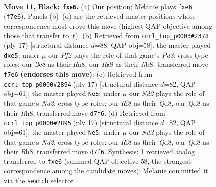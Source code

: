 \documentclass[11pt]{article}
\begin{document}
\clearpage

\begin{figure}[p]\centering
\begin{subfigure}{0.46\textwidth}\centering
\resizebox{\linewidth}{!}{%
\newchessgame
\chessboard[
  setfen={rnbq1rk1/pp1nbppp/4P3/8/P2P2PP/2N2N2/1P3P2/R1BQKB1R b KQ - 0 11},
  showmover=false,
  pgfstyle=straightmove, color=movearrow, markmove={f7-e6}
]}
\caption{}
\end{subfigure}\hfill
\begin{subfigure}{0.46\textwidth}\centering
\resizebox{\linewidth}{!}{%
\newchessgame
\chessboard[
  setfen={rnbq1rk1/ppp3bp/3p1np1/4P3/2P5/2N2N2/PP2BPPP/R1BQK2R b KQ - 0 9},
  showmover=false,
  pgfstyle=straightmove, color=movearrow, markmove={d6-e5}
]}
\caption{}
\end{subfigure}
\\[4pt]
\begin{subfigure}{0.46\textwidth}\centering
\resizebox{\linewidth}{!}{%
\newchessgame
\chessboard[
  setfen={rnbqk2r/pp1nppbp/4P1p1/8/3N4/2N5/PPP3PP/R1BQKB1R b KQkq - 0 9},
  showmover=false,
  pgfstyle=straightmove, color=movearrow, markmove={d7-e5}
]}
\caption{}
\end{subfigure}\hfill
\begin{subfigure}{0.46\textwidth}\centering
\resizebox{\linewidth}{!}{%
\newchessgame
\chessboard[
  setfen={rnbqk2r/pp1nppbp/4P1p1/8/3N4/2N5/PPP3PP/R1BQKB1R b KQkq - 0 9},
  showmover=false,
  pgfstyle=straightmove, color=movearrow, markmove={d7-e5}
]}
\caption{}
\end{subfigure}
\caption{\textbf{Move 11, Black: \texttt{fxe6}.} (a) Our position; Melanie plays \texttt{fxe6} (\texttt{f7e6}). Panels (b)--(d) are the retrieved master positions whose correspondence most drove this move (highest QAP objective among those that transfer to it). (b) Retrieved from \texttt{ccrl\_top\_p0003\#2378} (ply 17) [structural distance $d$=88, QAP obj=58]: the master played \texttt{dxe5}; under $\mu$ our \emph{Pf2} plays the role of that game's \emph{Pd3}; cross-type roles: our \emph{B}c8 as their \emph{R}a8, our \emph{R}a8 as their \emph{N}b8; transferred move \texttt{f7e6} \textbf{(endorses this move)}. (c) Retrieved from \texttt{ccrl\_top\_p0000\#2894} (ply 17) [structural distance $d$=82, QAP obj=61]: the master played \texttt{Ne5}; under $\mu$ our \emph{Nd2} plays the role of that game's \emph{Nd2}; cross-type roles: our \emph{R}f8 as their \emph{Q}d8, our \emph{Q}d8 as their \emph{R}h8; transferred move \texttt{d7f6}. (d) Retrieved from \texttt{ccrl\_top\_p0000\#2895} (ply 17) [structural distance $d$=82, QAP obj=61]: the master played \texttt{Ne5}; under $\mu$ our \emph{Nd2} plays the role of that game's \emph{Nd2}; cross-type roles: our \emph{R}f8 as their \emph{Q}d8, our \emph{Q}d8 as their \emph{R}h8; transferred move \texttt{d7f6}. Synthesis: 1 retrieved analog transferred to \texttt{fxe6} (summed QAP objective 58, the strongest correspondence among the candidate moves); Melanie committed it via the \texttt{search} selector.}
\label{fig:thought-m21}
\end{figure}
\end{document}
